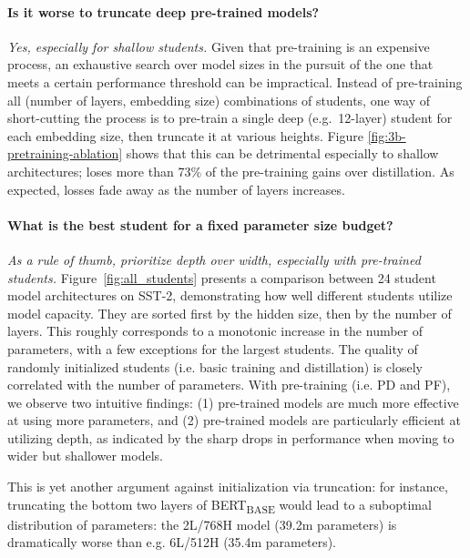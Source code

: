 \paragraph{Is it worse to truncate deep pre-trained models?}
\emph{Yes, especially for shallow students.} Given that pre-training is an expensive process, an exhaustive search over model sizes in the pursuit of the one that meets a certain performance threshold can be impractical. Instead of pre-training all (number of layers, embedding size) combinations of students, one way of short-cutting the process is to pre-train a single deep (e.g.~12-layer) student for each embedding size, then truncate it at various heights. Figure \ref{fig:3b-pretraining-ablation} shows that this can be detrimental especially to shallow architectures; \berttiny loses more than 73\% of the pre-training gains over distillation. As expected, losses fade away as the number of layers increases.

\paragraph{{What is the best student for a fixed parameter size budget?}}
\emph{As a rule of thumb, prioritize depth over width, especially with pre-trained students.} Figure~\ref{fig:all_students} presents a comparison between 24 student model architectures on SST-2, demonstrating how well different students utilize model capacity. They are sorted first by the hidden size, then by the number of layers. This roughly corresponds to a monotonic increase in the number of parameters, with a few exceptions for the largest students. The quality of randomly initialized students (i.e. basic training and distillation) is closely correlated with the number of parameters. With pre-training (i.e. PD and PF), we observe two intuitive findings: (1) pre-trained models are much more effective at using more parameters, and (2) pre-trained models are particularly efficient at utilizing depth, as indicated by the sharp drops in performance when moving to wider but shallower models.

This is yet another argument against initialization via truncation: for instance, truncating the bottom two layers of BERT\textsubscript{BASE} would lead to a suboptimal distribution of parameters: the 2L/768H model (39.2m parameters) is dramatically worse than e.g. 6L/512H (35.4m parameters). 

